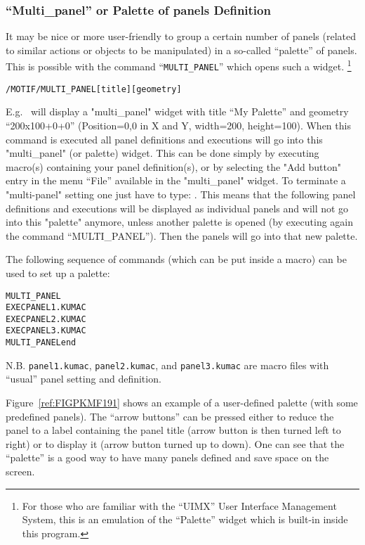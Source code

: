 \subsubsection{``Multi\_panel'' or Palette of panels Definition}
 
It may be nice or more user-friendly to group a certain number of
panels (related to similar actions or objects to be manipulated)
in a so-called ``palette'' of panels.  This is possible with the
command ``\texttt{MULTI\_PANEL}'' which opens such a widget.
\footnote{For those who are familiar with the ``UIMX'' User Interface
Management System, this is an emulation of the ``Palette'' widget
which is built-in inside this program.}
 
\begin{alltt}
 /MOTIF/MULTI_PANEL [title] [geometry]
\end{alltt}
E.g.\  will display a
"multi\_panel" widget with title ``My Palette'' and geometry
``200x100+0+0'' (Position=0,0 in X and Y, width=200, height=100).
When this command is executed all panel definitions and executions will go
into this "multi\_panel" (or palette) widget. This can be done simply by
executing macro(s) containing your panel definition(s), or
by selecting the "Add button" entry in the menu ``File'' available
in the "multi\_panel" widget.
To terminate a "multi-panel" setting one just have to type:
. This means that the following panel definitions
and executions will be displayed as individual panels and will not go into
this "palette" anymore, unless another palette is opened (by executing again
the command ``MULTI\_PANEL''). Then the panels will go
into that new palette.
 
The following sequence of commands (which can be put inside a macro)
can be used to set up a palette:
\begin{alltt}
   MULTI_PANEL
   EXEC PANEL1.KUMAC
   EXEC PANEL2.KUMAC
   EXEC PANEL3.KUMAC
   MULTI_PANEL end
\end{alltt}
N.B. \texttt{panel1.kumac}, \texttt{panel2.kumac}, and
\texttt{panel3.kumac} are macro files with ``usual'' panel
setting and definition. 
 
Figure~\ref{ref:FIGPKMF191} shows an example of a user-defined
palette (with some predefined panels). The ``arrow buttons'' can be
pressed either to reduce the panel to a label containing the panel title
(arrow button is then turned left to right) or to display it (arrow button
turned up to down). One can see that the ``palette'' is a good way
to have many panels defined and save space on the screen.
 
